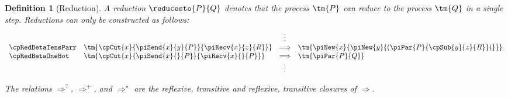 \documentclass[submission,copyright,creativecommons]{eptcs}
\newtheorem{definition}{Definition}
\begin{document}
\begin{definition}[Reduction]\label{def:hcp-reduction}
  A reduction $\reducesto{P}{Q}$ denotes that the process $\tm{P}$ can reduce
  to the process $\tm{Q}$ in a single step. Reductions can only be constructed
  as follows:
  \begin{gather*}
    \begin{array}{llcll}
      &
      & \vdots
      &
      \\
      \cpRedBetaTensParr
      & \tm{\cpCut{x}{\piSend{x}{y}{P}}{\piRecv{x}{z}{R}}}
      & \Longrightarrow
      & \tm{\piNew{x}{\piNew{y}{(\piPar{P}{\cpSub{y}{z}{R}})}}}
      \\
      \cpRedBetaOneBot
      & \tm{\cpCut{x}{\piSend{x}{}{P}}{\piRecv{x}{}{P}}}
      & \Longrightarrow
      & \tm{\piPar{P}{Q}}
      \\
      &
      & \vdots
      &
    \end{array}
  \end{gather*}
  \begin{center}
    \begin{prooftree*}
      \SYM{\hccpRedGammaNew}
    \end{prooftree*}
    \begin{prooftree*}
      \SYM{\hccpRedGammaMix}
    \end{prooftree*}
    \begin{prooftree*}
      \SYM{\hccpRedGammaEquiv}
    \end{prooftree*}
  \end{center}
  The relations $\Longrightarrow^{?}$, $\Longrightarrow^{+}$, and
  $\Longrightarrow^\star$ are the reflexive, transitive and reflexive,
  transitive closures of $\Longrightarrow$. 
\end{definition}
\end{document}

